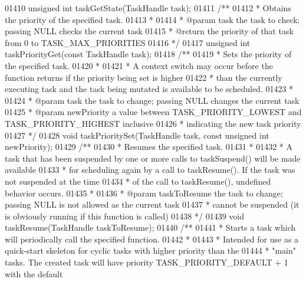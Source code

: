 \begin{DoxyCode}
{{{{{{{{{01410 \textcolor{keywordtype}{unsigned} \textcolor{keywordtype}{int} taskGetState(TaskHandle task);
01411 \textcolor{comment}{/**}
01412 \textcolor{comment}{ * Obtains the priority of the specified task.}
01413 \textcolor{comment}{ *}
01414 \textcolor{comment}{ * @param task the task to check; passing NULL checks the current task}
01415 \textcolor{comment}{ * @return the priority of that task from 0 to TASK\_MAX\_PRIORITIES}
01416 \textcolor{comment}{ */}
01417 \textcolor{keywordtype}{unsigned} \textcolor{keywordtype}{int} taskPriorityGet(\textcolor{keyword}{const} TaskHandle task);
01418 \textcolor{comment}{/**}
01419 \textcolor{comment}{ * Sets the priority of the specified task.}
01420 \textcolor{comment}{ *}
01421 \textcolor{comment}{ * A context switch may occur before the function returns if the priority being set is higher}
01422 \textcolor{comment}{ * than the currently executing task and the task being mutated is available to be scheduled.}
01423 \textcolor{comment}{ *}
01424 \textcolor{comment}{ * @param task the task to change; passing NULL changes the current task}
01425 \textcolor{comment}{ * @param newPriority a value between TASK\_PRIORITY\_LOWEST and TASK\_PRIORITY\_HIGHEST inclusive}
01426 \textcolor{comment}{ * indicating the new task priority}
01427 \textcolor{comment}{ */}
01428 \textcolor{keywordtype}{void} taskPrioritySet(TaskHandle task, \textcolor{keyword}{const} \textcolor{keywordtype}{unsigned} \textcolor{keywordtype}{int} newPriority);
01429 \textcolor{comment}{/**}
01430 \textcolor{comment}{ * Resumes the specified task.}
01431 \textcolor{comment}{ *}
01432 \textcolor{comment}{ * A task that has been suspended by one or more calls to taskSuspend() will be made available}
01433 \textcolor{comment}{ * for scheduling again by a call to taskResume(). If the task was not suspended at the time}
01434 \textcolor{comment}{ * of the call to taskResume(), undefined behavior occurs.}
01435 \textcolor{comment}{ *}
01436 \textcolor{comment}{ * @param taskToResume the task to change; passing NULL is not allowed as the current task}
01437 \textcolor{comment}{ * cannot be suspended (it is obviously running if this function is called)}
01438 \textcolor{comment}{ */}
01439 \textcolor{keywordtype}{void} taskResume(TaskHandle taskToResume);
01440 \textcolor{comment}{/**}
01441 \textcolor{comment}{ * Starts a task which will periodically call the specified function.}
01442 \textcolor{comment}{ *}
01443 \textcolor{comment}{ * Intended for use as a quick-start skeleton for cyclic tasks with higher priority than the}
01444 \textcolor{comment}{ * "main" tasks. The created task will have priority TASK\_PRIORITY\_DEFAULT + 1 with the default}
}}}}}}}}}
\end{DoxyCode}
